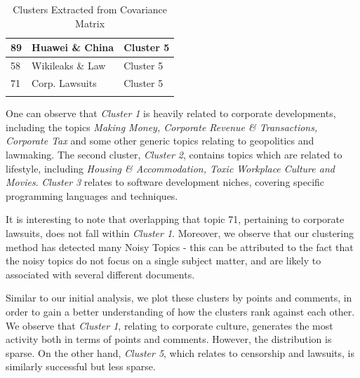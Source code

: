 \documentclass[11pt,journal,final,a4paper]{IEEEtran}
\begin{document}
\begin{table}[!ht]
\begin{tabular}{lll}
89                                                 & Huawei \& China                                                                                              & Cluster 5    \\ \hline
58                                                 & Wikileaks \& Law                                                                                             & Cluster 5    \\ \hline
71                                                 & Corp. Lawsuits                                                                                               & Cluster 5    \\ \hline
\\
\end{tabular}
\caption{Clusters Extracted from Covariance Matrix}
\label{tab:clusters}
\end{table}

One can observe that \textit{Cluster 1} is heavily related to corporate developments, including the topics \textit{Making Money, Corporate Revenue \& Transactions, Corporate Tax} and some other generic topics relating to geopolitics and lawmaking. The second cluster, \textit{Cluster 2}, contains topics which are related to lifestyle, including \textit{Housing \& Accommodation, Toxic Workplace Culture and Movies}. \textit{Cluster 3} relates to software development niches, covering specific programming languages and techniques. 

It is interesting to note that overlapping that topic 71, pertaining to corporate lawsuits, does not fall within \textit{Cluster 1}. Moreover, we observe that our clustering method has detected many Noisy Topics - this can be attributed to the fact that the noisy topics do not focus on a single subject matter, and are likely to associated with several different documents.

Similar to our initial analysis, we plot these clusters by points and comments, in order to gain a better understanding of how the clusters rank against each other.  We observe that \textit{Cluster 1}, relating to corporate culture, generates the most activity both in terms of points and comments. However, the distribution is sparse. On the other hand, \textit{Cluster 5}, which relates to censorship and lawsuits, is similarly successful but less sparse.
\end{document}
